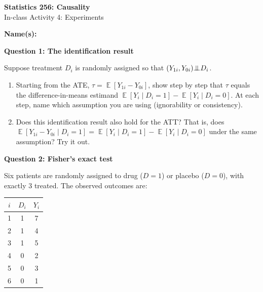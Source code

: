 \documentclass[11pt]{article}
\newcommand{\indep}{{\bot\negthickspace\negthickspace\bot}}
\DeclareMathOperator{\E}{\mathbb{E}}
\begin{document}
\begin{center}
{\Large \textbf{Statistics 256: Causality}} \\[6pt]
{\large In-class Activity 4: Experiments}
\end{center}

\vspace{4pt}
\noindent\textbf{Name(s):} \hrulefill

\vspace{16pt}

\noindent\textbf{Question 1: The identification result}

\medskip
\noindent Suppose treatment $D_i$ is randomly assigned so that $(Y_{1i}, Y_{0i}) \indep D_i$.

\begin{enumerate}[label=(\alph*)]
\item Starting from the ATE, $\tau = \E[Y_{1i} - Y_{0i}]$, show step by step that $\tau$ equals the difference-in-means estimand $\E[Y_i \mid D_i=1] - \E[Y_i \mid D_i=0]$.  At each step, name which assumption you are using (ignorability or consistency).

\vspace{3.5cm}

\item Does this identification result also hold for the ATT?  That is, does $\E[Y_{1i} - Y_{0i} \mid D_i = 1] = \E[Y_i \mid D_i=1] - \E[Y_i \mid D_i=0]$ under the same assumption? Try it out.

\vspace{2.5cm}
\end{enumerate}

\noindent\textbf{Question 2: Fisher's exact test}

\medskip
\noindent Six patients are randomly assigned to drug ($D=1$) or placebo ($D=0$), with exactly 3 treated.  The observed outcomes are:

\begin{center}
\begin{tabular}{c c c}
\toprule
$i$ & $D_i$ & $Y_i$ \\
\midrule
1 & 1 & 7 \\
2 & 1 & 4 \\
3 & 1 & 5 \\
4 & 0 & 2 \\
5 & 0 & 3 \\
6 & 0 & 1 \\
\bottomrule
\end{tabular}
\end{center}
\end{document}
